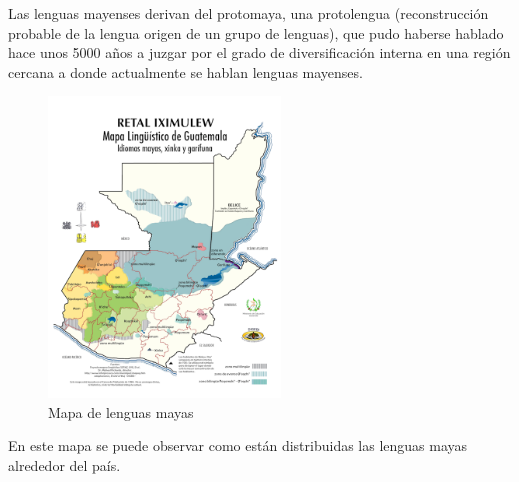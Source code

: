 \documentclass[a4paper,openright,11pt]{article}
\begin{document}
Las lenguas mayenses derivan del protomaya, una protolengua (reconstrucción probable de la lengua origen de un grupo de lenguas), que pudo haberse hablado hace unos 5000 años a juzgar por el grado de diversificación interna en una región cercana a donde actualmente se hablan lenguas mayenses.

\begin{figure}[H]
	\centering
	\includegraphics[width=0.55\textwidth]{mapa}
	\caption{Mapa de lenguas mayas}
	\label{fig:map}
\end{figure}
En este mapa se puede observar como están distribuidas las lenguas mayas alrededor del país.
\end{document}
